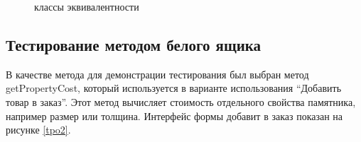 \documentclass[a4paper,article,14pt]{extarticle}
\begin{document}
\begin{figure}[ht]
\begin{center}
\caption{\label{tpo1table} классы эквивалентности}
\end {center}
\end {figure}

\subsection{Тестирование методом белого ящика}

В качестве метода для демонстрации тестирования был выбран метод getPropertyCost, который используется в варианте использования 
``Добавить товар в заказ''. Этот метод вычисляет стоимость отдельного свойства памятника, например размер
или толщина.
Интерфейс формы добавит в заказ показан на рисунке \ref{tpo2}.
\end{document}
